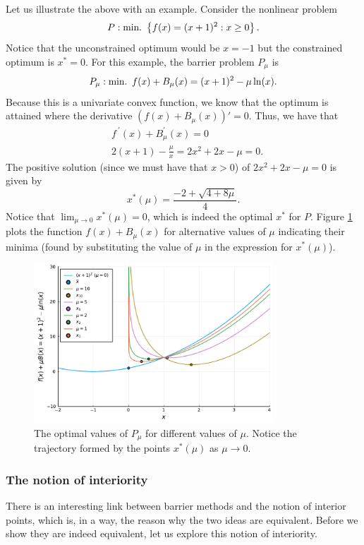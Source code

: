 Let us illustrate the above with an example. Consider the nonlinear problem 
	$$
	P : \mathop{\text{min.~}} \left\{ f(x) = (x + 1)^2 : x \geq 0 \right \}.
	$$ 
	Notice that the unconstrained optimum would be $x =-1$ but the constrained optimum is $x^* = 0$. For this example, the barrier problem $P_\mu$ is
	$$P_\mu : \mathop{\text{min.~}} f(x) + B_\mu(x) = (x + 1)^2 - \mu \ln(x).$$
	Because this is a univariate convex function, we know that the optimum is attained where the derivative $(f(x) + B_\mu(x))' = 0$. Thus, we have that
	\begin{align*}
		& f^{~\prime}(x) + B_\mu^\prime(x) = 0 \\
		& 2(x+1) - \frac{\mu}{x} = 2x^2 + 2x -\mu = 0.
	\end{align*}
	The positive solution (since we must have that $x > 0$) of $2x^2 + 2x -\mu = 0$ is given by
	$$ x^*(\mu) = \frac{-2 + \sqrt{4 + 8\mu}}{4}.  
	$$ 
	Notice that $\lim_{\mu \rightarrow 0}x^*(\mu) = 0$, which is indeed the optimal $x^*$ for $P$. Figure \ref{p1c7:fig:example-barrier} plots the function $f(x) + B_\mu(x)$ for alternative values of $\mu$ indicating their minima (found by substituting the value of $\mu$ in the expression for $x^*(\mu)$). 

\begin{figure}
	\includegraphics[width=0.8\textwidth]{chapters/chapter_7/figures/ex-barrier.pdf}
	\caption{The optimal values of $P_\mu$ for different values of $\mu$. Notice the trajectory formed by the points $x^*(\mu)$ as $\mu \to 0$.} \label{p1c7:fig:example-barrier} 	
\end{figure}


\subsubsection{The notion of interiority}

There is an interesting link between barrier methods and the notion of interior points, which is, in a way, the reason why the two ideas are equivalent. Before we show they are indeed equivalent, let us explore this notion of interiority.

